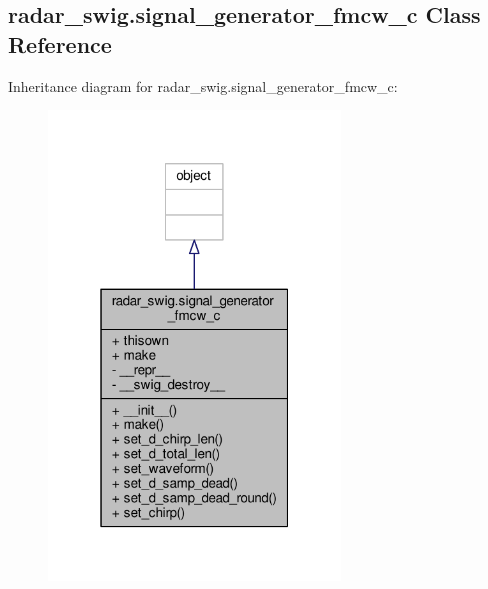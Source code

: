 \subsection{radar\+\_\+swig.\+signal\+\_\+generator\+\_\+fmcw\+\_\+c Class Reference}
\label{classradar__swig_1_1signal__generator__fmcw__c}


Inheritance diagram for radar\+\_\+swig.\+signal\+\_\+generator\+\_\+fmcw\+\_\+c\+:
\nopagebreak
\begin{figure}[H]
\begin{center}
\leavevmode
\includegraphics[width=220pt]{d4/d6d/classradar__swig_1_1signal__generator__fmcw__c__inherit__graph}
\end{center}
\end{figure}


